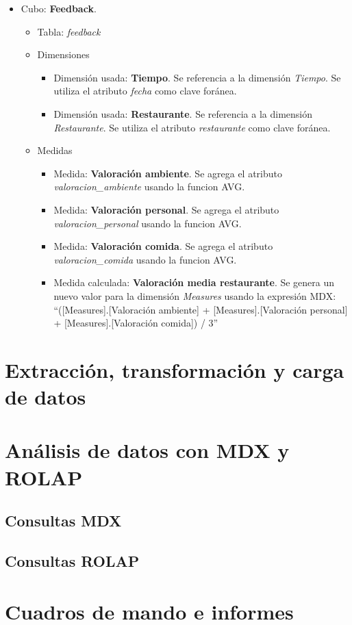 \documentclass[11pt]{opticajnl}
\begin{document}
\begin{itemize}
\item Cubo: \textbf{Feedback}.
\begin{itemize}
\item Tabla: \textit{feedback}
\item Dimensiones
\begin{itemize}
\item Dimensión usada: \textbf{Tiempo}. Se referencia a la dimensión \textit{Tiempo}. Se utiliza el atributo \textit{fecha} como clave foránea.
\item Dimensión usada: \textbf{Restaurante}. Se referencia a la dimensión \textit{Restaurante}. Se utiliza el atributo \textit{restaurante} como clave foránea.
\end{itemize}
\item Medidas
\begin{itemize}
\item Medida: \textbf{Valoración ambiente}. Se agrega el atributo \textit{valoracion\_ambiente} usando la funcion AVG.
\item Medida: \textbf{Valoración personal}. Se agrega el atributo \textit{valoracion\_personal} usando la funcion AVG.
\item Medida: \textbf{Valoración comida}. Se agrega el atributo \textit{valoracion\_comida} usando la funcion AVG.
\item Medida calculada: \textbf{Valoración media restaurante}. Se genera un nuevo valor para la dimensión \textit{Measures} usando la expresión MDX: ``([Measures].[Valoración ambiente] + [Measures].[Valoración personal] + [Measures].[Valoración comida]) / 3''
\end{itemize}
\end{itemize}
\end{itemize}

\section{Extracción, transformación y carga de datos}

\section{Análisis de datos con MDX y ROLAP}

\subsection{Consultas MDX}

\subsection{Consultas ROLAP}

\section{Cuadros de mando e informes}
\end{document}
